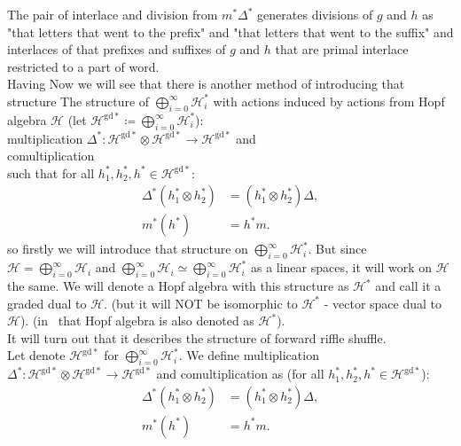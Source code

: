 \documentclass[a4paper]{article}
\newcommand{\gdd}[1]{#1^{\mathrm{gd}*}}
\begin{document}
The pair of interlace and division from $m^*\Delta^*$ generates divisions of $g$ and $h$ as "that letters
that went to the prefix" and "that letters that went to the suffix" and interlaces of that prefixes and suffixes of $g$ and $h$ that are primal interlace restricted to a part of word. \\
Having
Now we will see that there is another method of introducing that structure
The
structure of $\displaystyle\bigoplus^{\infty}_{i = 0} \mathcal{H}_i^*$ with actions induced by actions from
Hopf algebra $\mathcal{H}$ (let $\gdd{\mathcal{H}} \coloneqq \displaystyle\bigoplus^{\infty}_{i = 0} \mathcal{H}_i^*$): \\
multiplication
$\Delta^* : \mathcal{H}^{\mathrm{gd}*} \otimes \gdd{\mathcal{H}} \to \gdd{\mathcal{H}}$ and \\
comultiplication
\text{$m^* : \gdd{\mathcal{H}} \to \gdd{\mathcal{H}} \otimes \gdd{\mathcal{H}}$} \\
such that for all $h_1^*, h_2^*, h^* \in \gdd{\mathcal{H}}$:
\begin{align*}
\Delta^*(h_1^* \otimes h_2^*) &= (h_1^* \otimes h_2^*)\Delta, \\
m^*(h^*) &= h^*m.
\end{align*}
so firstly we will introduce that structure on
$\displaystyle\bigoplus^{\infty}_{i = 0} \mathcal{H}_i^*$. But since $\mathcal{H} =
\displaystyle\bigoplus^{\infty}_{i = 0} \mathcal{H}_i$ and $\displaystyle\bigoplus^{\infty}_{i = 0}
\mathcal{H}_i \simeq \displaystyle\bigoplus^{\infty}_{i = 0} \mathcal{H}_i^*$ as a linear spaces, it will
work on $\mathcal{H}$ the same. We will denote a Hopf algebra with this structure
as $\mathcal{H}^*$ and call it a graded dual to $\mathcal{H}$. (but it will NOT be isomorphic to
$\mathcal{H}^*$ - vector space dual to $\mathcal{H}$). (in~\cite{Diaconis2014} that Hopf algebra is also
denoted as $\mathcal{H}^*$).  \\
It will turn out that it describes the structure of forward riffle shuffle. \\
\indent Let denote $\gdd{\mathcal{H}}$ for $\displaystyle\bigoplus^{\infty}_{i = 0} \mathcal{H}_i^*$.
We define multiplication
$\Delta^* : \mathcal{H}^{\mathrm{gd}*} \otimes \gdd{\mathcal{H}} \to \gdd{\mathcal{H}}$ and
comultiplication
\text{$m^* : \gdd{\mathcal{H}} \to \gdd{\mathcal{H}} \otimes \gdd{\mathcal{H}}$} as
(for all $h_1^*, h_2^*, h^* \in \gdd{\mathcal{H}}$):
\begin{align*}
\Delta^*(h_1^* \otimes h_2^*) &= (h_1^* \otimes h_2^*)\Delta, \\
m^*(h^*) &= h^*m.
\end{align*}
\end{document}
